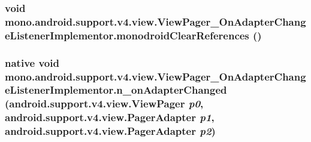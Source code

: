 \hypertarget{classmono_1_1android_1_1support_1_1v4_1_1view_1_1_view_pager___on_adapter_change_listener_implementor_dd7cb4630bc0f072ba6327ad7f8690c8}{
\subsubsection[{monodroidClearReferences}]{\setlength{\rightskip}{0pt plus 5cm}void mono.android.support.v4.view.ViewPager\_\-OnAdapterChangeListenerImplementor.monodroidClearReferences ()}}
\label{classmono_1_1android_1_1support_1_1v4_1_1view_1_1_view_pager___on_adapter_change_listener_implementor_dd7cb4630bc0f072ba6327ad7f8690c8}


\hypertarget{classmono_1_1android_1_1support_1_1v4_1_1view_1_1_view_pager___on_adapter_change_listener_implementor_02dcfc9434d277d9b65a7bffe37ccc8e}{
\subsubsection[{n\_\-onAdapterChanged}]{\setlength{\rightskip}{0pt plus 5cm}native void mono.android.support.v4.view.ViewPager\_\-OnAdapterChangeListenerImplementor.n\_\-onAdapterChanged (android.support.v4.view.ViewPager {\em p0}, \/  android.support.v4.view.PagerAdapter {\em p1}, \/  android.support.v4.view.PagerAdapter {\em p2})}}
\label{classmono_1_1android_1_1support_1_1v4_1_1view_1_1_view_pager___on_adapter_change_listener_implementor_02dcfc9434d277d9b65a7bffe37ccc8e}



